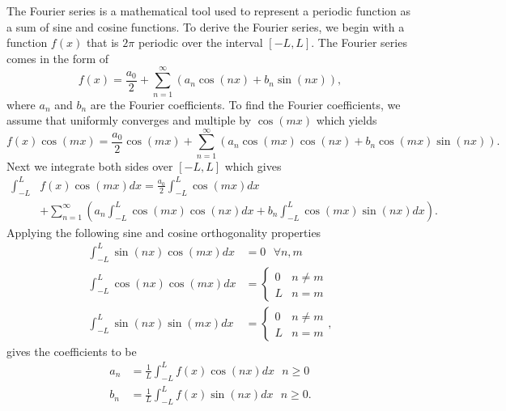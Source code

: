 \documentclass[12pt]{article}%
\numberwithin{equation}{subsection}
\begin{document}
The Fourier series is a mathematical tool used to represent a periodic function as a sum of sine and cosine functions. To derive the Fourier series, we begin with a function $f(x)$ that is $2\pi$ periodic over the interval $[-L,L]$. The Fourier series comes in the form of
\begin{equation} \label{Fourier series}
    f(x) = \frac{a_0}{2} + \sum_{n=1}^{\infty}(a_n \cos(n x) + b_n \sin(n x)), 
\end{equation} 
where $a_n$ and $b_n$ are the Fourier coefficients. To find the Fourier coefficients, we assume that  uniformly converges and multiple by $\cos(mx)$ which yields
\begin{equation}
    f(x)\cos(mx) = \frac{a_0}{2}\cos(mx) + \sum_{n=1}^{\infty}(a_n \cos(mx)\cos(n x) + b_n \cos(mx)\sin(n x)).
\end{equation}
Next we integrate both sides over $[-L,L]$ which gives
\begin{equation}
    \begin{split}
        \int_{-L}^L &f(x)\cos(mx) dx = \frac{a_0}{2} \int_{-L}^L \cos(mx) dx \\ 
        &+ \sum_{n=1}^{\infty}\left(a_n \int_{-L}^L \cos(mx)\cos(n x)dx + b_n \int_{-L}^L\cos(mx)\sin(n x) dx\right).
    \end{split}
\end{equation}
Applying the following sine and cosine orthogonality properties
\begin{subequations}
    \begin{align}
        \int_{-L}^L \sin(nx) \cos(mx) dx &= 0 ~~~ \forall n,m\\
        \int_{-L}^L \cos(nx) \cos(mx) dx &= \begin{cases}
            0 & n \neq m\\
            L & n = m
        \end{cases}\\
        \int_{-L}^L \sin(nx) \sin(mx) dx &= \begin{cases}
            0 & n \neq m\\
            L & n = m
        \end{cases},
    \end{align}
\end{subequations}
gives the coefficients to be
\begin{subequations}
    \begin{align}
        a_n &= \frac{1}{L} \int_{-L}^{L} f(x) \cos(nx) dx ~~~ n \geq 0\\
        b_n &= \frac{1}{L} \int_{-L}^{L} f(x) \sin(nx) dx ~~~ n \geq 0.
    \end{align}
\end{subequations}
\end{document}
